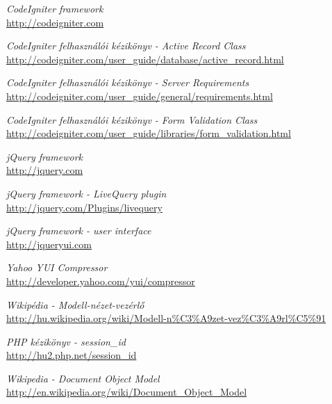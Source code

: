 \documentclass[12pt,a4paper,twoside]{article}
\begin{document}
\begin{thebibliography}{99}

  \emph{CodeIgniter framework}\\
  \url{http://codeigniter.com}

  \emph{CodeIgniter felhasználói kézikönyv - Active Record Class}\\
  \url{http://codeigniter.com/user_guide/database/active_record.html}

  \emph{CodeIgniter felhasználói kézikönyv - Server Requirements}\\
  \url{http://codeigniter.com/user_guide/general/requirements.html}

  \emph{CodeIgniter felhasználói kézikönyv - Form Validation Class}\\
  \url{http://codeigniter.com/user_guide/libraries/form_validation.html}

  \emph{jQuery framework}\\
  \url{http://jquery.com}

  \emph{jQuery framework - LiveQuery plugin}\\
  \url{http://jquery.com/Plugins/livequery}

  \emph{jQuery framework - user interface}\\
  \url{http://jqueryui.com}

  \emph{Yahoo YUI Compressor}\\
  \url{http://developer.yahoo.com/yui/compressor}

  \emph{Wikipédia - Modell-nézet-vezérlő}\\
  \url{http://hu.wikipedia.org/wiki/Modell-n\%C3\%A9zet-vez\%C3\%A9rl\%C5\%91}

  \emph{PHP kézikönyv - session\_id}\\
  \url{http://hu2.php.net/session_id}

  \emph{Wikipedia - Document Object Model}\\
  \url{http://en.wikipedia.org/wiki/Document_Object_Model}

\end{thebibliography}
\end{document}
